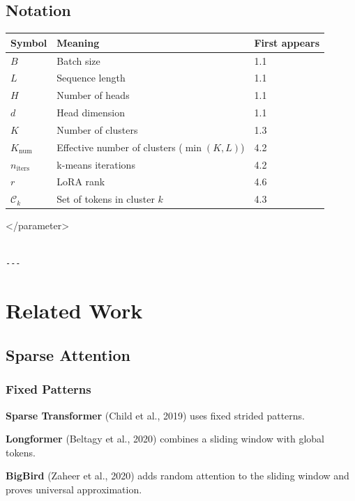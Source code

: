 \subsection{Notation}

\begin{table}[H]
\centering
\small
\begin{tabular}{lll}
\toprule
\textbf{Symbol} & \textbf{Meaning} & \textbf{First appears} \\
\midrule
$B$ & Batch size & 1.1 \\
$L$ & Sequence length & 1.1 \\
$H$ & Number of heads & 1.1 \\
$d$ & Head dimension & 1.1 \\
$K$ & Number of clusters & 1.3 \\
$K_{\text{num}}$ & Effective number of clusters ($\min(K, L)$) & 4.2 \\
$n_{\text{iters}}$ & k-means iterations & 4.2 \\
$r$ & LoRA rank & 4.6 \\
$\mathcal{C}_k$ & Set of tokens in cluster $k$ & 4.3 \\
\bottomrule
\end{tabular}
\end{table}
\textless{}/parameter\textgreater{}
\begin{lstlisting}

---
\end{lstlisting}


\section{Related Work}

\subsection{Sparse Attention}

\subsubsection{Fixed Patterns}

\textbf{Sparse Transformer} (Child et al., 2019) uses fixed strided patterns.

\textbf{Longformer} (Beltagy et al., 2020) combines a sliding window with global 
tokens.

\textbf{BigBird} (Zaheer et al., 2020) adds random attention to the sliding 
window and proves universal approximation.

